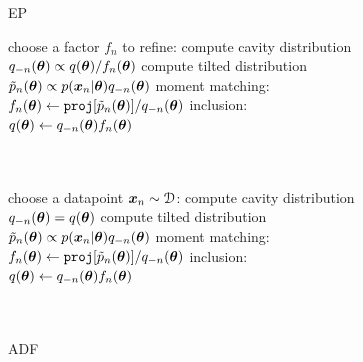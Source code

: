 \begin{figure}[!t]
\begin{minipage}[t]{0.32\linewidth}
\centering
\begin{algorithm}[H] 
\caption{EP} \small
\label{alg:ep} 
\begin{algorithmic}[1] 
	\STATE choose a factor $f_n$ to refine:
	\STATE compute cavity distribution \\$q_{-n}(\bm{\theta}) \propto q(\bm{\theta}) / f_n(\bm{\theta})$ 
	\STATE compute tilted distribution \\$\tilde{p}_n(\bm{\theta}) \propto p(\bm{x}_n|\bm{\theta}) q_{-n}(\bm{\theta})$
	\STATE moment matching: \\ \hspace{-5mm}$f_n(\bm{\theta}) \leftarrow \mathtt{proj}[\tilde{p}_n(\bm{\theta})] / q_{-n}(\bm{\theta}) $
	\STATE inclusion:\\ $q(\bm{\theta}) \leftarrow q_{-n}(\bm{\theta}) f_n(\bm{\theta})$\\\hspace{1mm}\\ \vspace{1.0mm} \hspace{1mm}\\
\end{algorithmic}
\end{algorithm}
\end{minipage}
%
\begin{minipage}[t]{0.32\linewidth}
\centering
\begin{algorithm}[H] 
\caption{ADF} \small
\label{alg:adf} 
\begin{algorithmic}[1] 
	\STATE choose a datapoint $\bm{x}_n\sim \mathcal{D}$:
	\STATE compute cavity distribution \\$q_{-n}(\bm{\theta}) = q(\bm{\theta})$
	\STATE compute tilted distribution \\$\tilde{p}_n(\bm{\theta}) \propto p(\bm{x}_n|\bm{\theta}) q_{-n}(\bm{\theta})$
	\STATE moment matching: \\ \hspace{-5mm}$f_n(\bm{\theta}) \leftarrow \mathtt{proj}[\tilde{p}_n(\bm{\theta})] / q_{-n}(\bm{\theta}) $
	\STATE inclusion:\\ $q(\bm{\theta}) \leftarrow q_{-n}(\bm{\theta}) f_n(\bm{\theta})$\\\hspace{1mm}\\ \vspace{1.0mm} \hspace{1mm}\\
\end{algorithmic}

\end{algorithm}
\end{minipage}
\end{figure}
